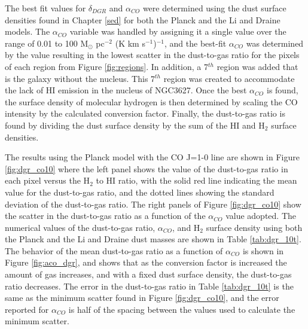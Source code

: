 The best fit values for $\delta_{DGR}$ and $\alpha_{CO}$ were determined using the dust surface densities found in Chapter \ref{sed} for both the Planck and the Li and Draine models.  The $\alpha_{CO}$ variable was handled by assigning it a single value over the range of 0.01 to 100 M$_\odot$ pc$^{-2}$ (K km s$^{-1}$)$^{-1}$, and the best-fit $\alpha_{CO}$ was determined by the value resulting in the lowest scatter in the dust-to-gas ratio for the pixels of each region from Figure \ref{fig:regions}.  In addition, a 7$^{th}$ region was added that is the galaxy without the nucleus.  This 7$^{th}$ region was created to accommodate the lack of HI emission in the nucleus of NGC3627.  Once the best $\alpha_{CO}$ is found, the surface density of molecular hydrogen is then determined by scaling the CO intensity by the calculated conversion factor.   Finally, the dust-to-gas ratio is found by dividing the dust surface density by the sum of the HI and H$_2$ surface densities.  

The results using the Planck model with the CO J=1-0 line are shown in Figure \ref{fig:dgr_co10} where the left panel shows the value of the dust-to-gas ratio in each pixel versus the H$_2$ to HI ratio, with the solid red line indicating the mean value for the dust-to-gas ratio, and the dotted lines showing the standard deviation of the dust-to-gas ratio.  The right panels of Figure \ref{fig:dgr_co10} show the scatter in the dust-to-gas ratio as a function of the $\alpha_{CO}$ value adopted.  The numerical values of the dust-to-gas ratio, $\alpha_{CO}$, and H$_2$ surface density using both the Planck and the Li and Draine dust masses are shown in Table \ref{tab:dgr_10t}.  The behavior of the mean dust-to-gas ratio as a function of $\alpha_{CO}$ is shown in Figure \ref{fig:aco_dgr}, and shows that as the conversion factor is increased the amount of gas increases, and with a fixed dust surface density, the dust-to-gas ratio decreases.  The error in the dust-to-gas ratio in Table \ref{tab:dgr_10t} is the same as the minimum scatter found in Figure \ref{fig:dgr_co10}, and the error reported for $\alpha_{CO}$ is half of the spacing between the values used to calculate the minimum scatter.

